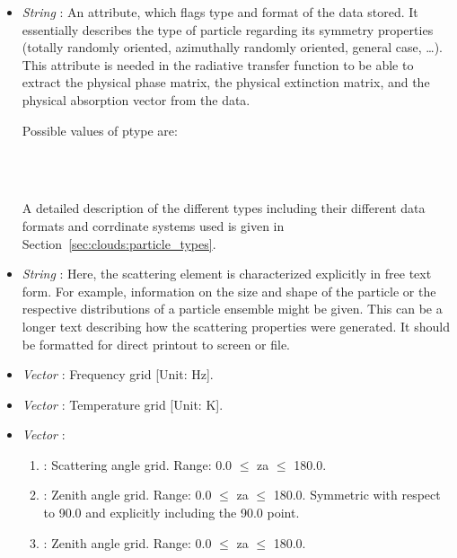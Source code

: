 \begin{itemize}
\item  {\sl String} : An attribute, which flags type and format
  of the data stored. It essentially describes the type of particle regarding
  its symmetry properties (totally randomly oriented, azimuthally randomly
  oriented, general case, \dots). This attribute is needed in the radiative
  transfer function to be able to extract the physical phase matrix, the
  physical extinction matrix,  and the physical absorption vector from the data.
  
  Possible values of ptype are:
  
   \\
   \\
  
  A detailed description of the different types including their different data
  formats and corrdinate systems used is given in
  Section~\ref{sec:clouds:particle_types}.

\item {\sl String} : Here, the scattering element
  is characterized explicitly in free text form. For example, information on
  the size and shape of the particle or the respective distributions of a
  particle ensemble might be given. This can be a longer text describing how the
  scattering properties were generated. It should be formatted for direct
  printout to screen or file.
  
\item {\sl Vector} : Frequency grid [Unit: Hz].
  
\item {\sl Vector} : Temperature grid [Unit: K].
  
\item {\sl Vector} :
  \begin{enumerate}
  \item {}:
    Scattering angle grid. Range: 0.0\degree{} $\le$ za $\le$ 180.0\degree{}.
  \item {}:
    Zenith angle grid. Range: 0.0\degree{} $\le$ za $\le$ 180.0\degree{}.
    Symmetric with respect to 90.0\degree{} and explicitly including the
    90.0\degree{} point.
  \item {}:
    Zenith angle grid. Range: 0.0\degree{} $\le$ za $\le$ 180.0\degree{}.
  \end{enumerate}
  

\end{itemize}
